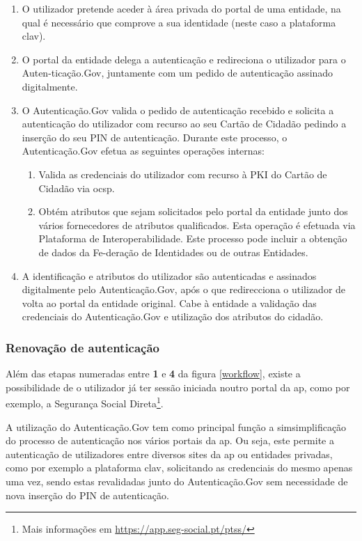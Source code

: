 \begin{enumerate}
    \item O utilizador pretende aceder à área privada do portal de uma entidade, na qual é necessário que comprove a sua identidade (neste caso a plataforma \gls{clav}).
    \item O portal da entidade delega a autenticação e redireciona o utilizador para o Auten-ticação.Gov, juntamente com um pedido de autenticação assinado digitalmente.
    \item O Autenticação.Gov valida o pedido de autenticação recebido e solicita a autenticação do utilizador com recurso ao seu Cartão de Cidadão pedindo a inserção do seu PIN de autenticação. Durante este processo, o Autenticação.Gov efetua as seguintes operações internas:
    \begin{enumerate}
        \item Valida as credenciais do utilizador com recurso à PKI do Cartão de Cidadão via \gls{ocsp}.
        \item Obtém atributos que sejam solicitados pelo portal da entidade junto dos vários fornecedores de atributos qualificados. Esta operação é efetuada via Plataforma de Interoperabilidade. Este processo pode incluir a obtenção de dados da Fe-deração de Identidades ou de outras Entidades.
    \end{enumerate}
    \item A identificação e atributos do utilizador são autenticadas e assinados digitalmente pelo Autenticação.Gov, após o que redirecciona o utilizador de volta ao portal da entidade original. Cabe à entidade a validação das credenciais do Autenticação.Gov e utilização dos atributos do cidadão.
\end{enumerate}

\cleardoublepage
\subsubsection{Renovação de autenticação}

Além das etapas numeradas entre \textbf{1} e \textbf{4} da figura \ref{workflow}, existe a possibilidade de o utilizador já ter sessão iniciada noutro portal da \gls{ap}, como por exemplo, a Segurança Social Direta\footnote{Mais informações em \url{https://app.seg-social.pt/ptss/}}.

A utilização do Autenticação.Gov tem como principal função a simsimplificação do processo de autenticação nos vários portais da \gls{ap}. Ou seja, este permite a autenticação de utilizadores entre diversos sites da \gls{ap} ou entidades privadas, como por exemplo a plataforma \gls{clav}, solicitando as credenciais do mesmo apenas uma vez, sendo estas revalidadas junto do Autenticação.Gov sem necessidade de nova inserção do PIN de autenticação.

